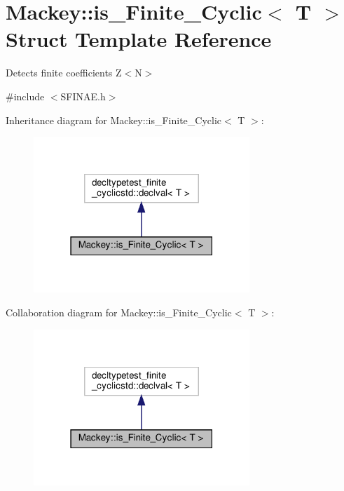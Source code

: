 \hypertarget{structMackey_1_1is__Finite__Cyclic}{}\section{Mackey\+:\+:is\+\_\+\+Finite\+\_\+\+Cyclic$<$ T $>$ Struct Template Reference}
\label{structMackey_1_1is__Finite__Cyclic}


Detects finite coefficients Z$<$\+N$>$  




{\ttfamily \#include $<$S\+F\+I\+N\+A\+E.\+h$>$}



Inheritance diagram for Mackey\+:\+:is\+\_\+\+Finite\+\_\+\+Cyclic$<$ T $>$\+:\nopagebreak
\begin{figure}[H]
\begin{center}
\leavevmode
\includegraphics[width=231pt]{structMackey_1_1is__Finite__Cyclic__inherit__graph}
\end{center}
\end{figure}


Collaboration diagram for Mackey\+:\+:is\+\_\+\+Finite\+\_\+\+Cyclic$<$ T $>$\+:\nopagebreak
\begin{figure}[H]
\begin{center}
\leavevmode
\includegraphics[width=231pt]{structMackey_1_1is__Finite__Cyclic__coll__graph}
\end{center}
\end{figure}


